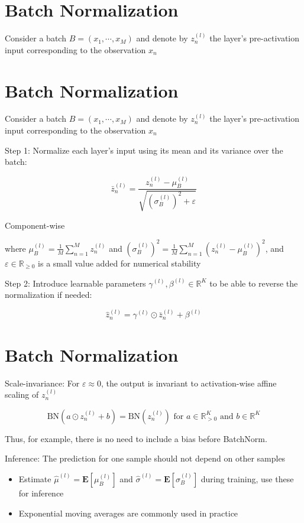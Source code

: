 \section*{Batch Normalization}
Consider a batch $B=\left(x_{1}, \cdots, x_{M}\right)$ and denote by $z_{n}^{(l)}$ the layer's pre-activation input corresponding to the observation $x_{n}$



\section*{Batch Normalization}
Consider a batch $B=\left(x_{1}, \cdots, x_{M}\right)$ and denote by $z_{n}^{(l)}$ the layer's pre-activation input corresponding to the observation $x_{n}$

Step 1: Normalize each layer's input using its mean and its variance over the batch:

$$
\bar{z}_{n}^{(l)}=\frac{z_{n}^{(l)}-\mu_{B}^{(l)}}{\sqrt{\left(\sigma_{B}^{(l)}\right)^{2}+\varepsilon}}
$$

Component-wise

where $\mu_{B}^{(l)}=\frac{1}{M} \sum_{n=1}^{M} z_{n}^{(l)}$ and $\left(\sigma_{B}^{(l)}\right)^{2}=\frac{1}{M} \sum_{n=1}^{M}\left(z_{n}^{(l)}-\mu_{B}^{(l)}\right)^{2}$, and $\varepsilon \in \mathbb{R}_{\geq 0}$ is a small value added for numerical stability

Step 2: Introduce learnable parameters $\gamma^{(l)}, \beta^{(l)} \in \mathbb{R}^{K}$ to be able to reverse the normalization if needed:

$$
\hat{z}_{n}^{(l)}=\gamma^{(l)} \odot \bar{z}_{n}^{(l)}+\beta^{(l)}
$$

\section*{Batch Normalization}
Scale-invariance: For $\varepsilon \approx 0$, the output is invariant to activation-wise affine scaling of $z_{n}^{(l)}$

$$
\mathrm{BN}\left(a \odot z_{n}^{(l)}+b\right)=\mathrm{BN}\left(z_{n}^{(l)}\right) \text { for } a \in \mathbb{R}_{>0}^{K} \text { and } b \in \mathbb{R}^{K}
$$

Thus, for example, there is no need to include a bias before BatchNorm.

Inference: The prediction for one sample should not depend on other samples

\begin{itemize}
  \item Estimate $\hat{\mu}^{(l)}=\mathbf{E}\left[\mu_{B}^{(l)}\right]$ and $\hat{\sigma}^{(l)}=\mathbf{E}\left[\sigma_{B}^{(l)}\right]$ during training, use these for inference
  \item Exponential moving averages are commonly used in practice
\end{itemize}

